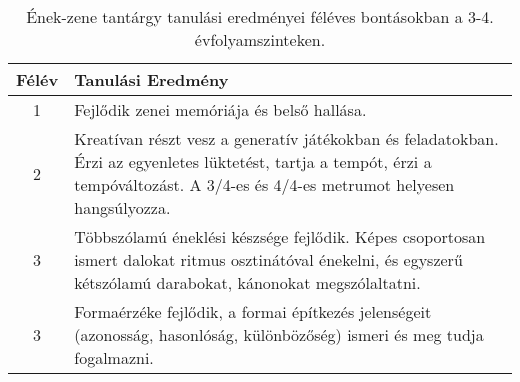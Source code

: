        
           \begin{longtable}{c | p{12cm} }
            \caption[Ének-zene 3-4.]{Ének-zene tantárgy tanulási eredményei féléves bontásokban a 3-4. évfolyamszinteken. }  \\

            \textbf{Félév} & \textbf{Tanulási Eredmény} \\
            \hline
            \endhead
                                
                                          1 &  Fejlődik zenei memóriája és belső hallása. \\ \hline
                                      
                                
                                          2 &  Kreatívan részt vesz a generatív játékokban és feladatokban. Érzi az egyenletes lüktetést, tartja a tempót, érzi a tempóváltozást. A 3/4-es és 4/4-es metrumot helyesen hangsúlyozza. \\ \hline
                                      
                                
                                          3 &  Többszólamú éneklési készsége fejlődik. Képes csoportosan ismert dalokat ritmus osztinátóval énekelni, és egyszerű kétszólamú darabokat, kánonokat megszólaltatni. \\ \hline
                                          3 &  Formaérzéke fejlődik, a formai építkezés jelenségeit (azonosság, hasonlóság, különbözőség) ismeri és meg tudja fogalmazni. \\ \hline
                                      

\end{longtable}
